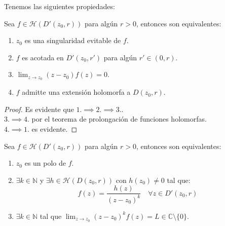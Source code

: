 Tenemos las siguientes propiedades:
\begin{proposición}
    Sea $f \in \mathcal{H}(D'(z_0, r))$ para algún $r > 0$, entonces son equivalentes:
    \begin{enumerate}
        \item $z_0$ es una singularidad evitable de $f$.
        \item $f$ es acotada en $D'(z_0, r')$ para algún $r' \in (0, r)$.
        \item $\lim_{z \to z_0} (z-z_0)f(z) = 0$.
        \item $f$ admitte una extensión holomorfa a $D(z_0, r)$.
    \end{enumerate}
\end{proposición}

\begin{proof}
    Es evidente que $1. \implies 2. \implies 3.$.\\
    $3. \implies 4.$ por el teorema de prolongación de funciones holomorfas.\\
    $4. \implies 1.$ es evidente.
\end{proof}

\begin{proposición}
    Sea $f \in \mathcal{H}(D'(z_0, r))$ para algún $r > 0$, entonces son equivalentes:
    \begin{enumerate}
        \item $z_0$ es un polo de $f$.
        \item $\exists k \in \mathbb{N}$ y $\exists h \in \mathcal{H}(D(z_0, r))$ con $h(z_0) \neq 0$ tal que:
        \[
        f(z) = \frac{h(z)}{(z-z_0)^k} \quad \forall z \in D'(z_0, r)
        \]
        \item $\exists k \in \mathbb{N}$ tal que $\lim_{z \to z_0} (z-z_0)^k f(z) = L \in \mathbb{C} \setminus \{0\}$.
    \end{enumerate} \label{prop:caracterizacion_polos}
\end{proposición}


